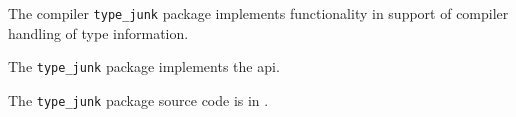 
The compiler {\tt type\_junk} package implements functionality in 
support of compiler handling of type information.

The {\tt type\_junk} package implements the  api.

The {\tt type\_junk} package source code is in .

